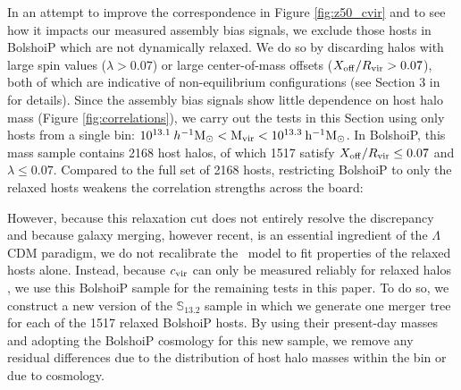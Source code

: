 \documentclass[twocolumn,apj,numberedappendix,twocolappendix,iop]{openjournal}
\begin{document}
In an attempt to improve the correspondence in Figure \ref{fig:z50_cvir} and to see how it impacts our measured assembly bias signals, we exclude those hosts in BolshoiP which are not dynamically relaxed. We do so by discarding halos with large spin values ($\lambda > 0.07$) or large center-of-mass offsets ($X_{\rm off}/R_{\rm vir} > 0.07$), both of which are indicative of non-equilibrium configurations (see Section 3 in \citealt{Klypin.etal.16} for details). Since the assembly bias signals show little dependence on host halo mass (Figure \ref{fig:correlations}), we carry out the tests in this Section using only hosts from a single bin: $10^{13.1} \>h^{-1}\rm M_\odot < M_{\rm vir} < 10^{13.3} \>h^{-1}\rm M_\odot$. In BolshoiP, this mass sample contains 2168 host halos, of which 1517 satisfy $X_{\rm off}/R_{\rm vir} \leq 0.07$ and $\lambda \leq 0.07$. Compared to the full set of 2168 hosts, restricting BolshoiP to only the relaxed hosts weakens the correlation strengths across the board:   

However, because this relaxation cut does not entirely resolve the discrepancy and because galaxy merging, however recent, is an essential ingredient of the $\Lambda$CDM paradigm, we do not recalibrate the \SatGen\ model to fit properties of the relaxed hosts alone. Instead, because $c_{\rm vir}$ can only be measured reliably for relaxed halos \citep{Klypin.etal.16}, we use this BolshoiP sample for the remaining tests in this paper. To do so, we construct a new version of the $\mathbb{S}_{13.2}$ sample in which we generate one merger tree for each of the 1517 relaxed BolshoiP hosts. By using their present-day masses and adopting the BolshoiP cosmology for this new sample, we remove any residual differences due to the distribution of host halo masses within the bin or due to cosmology. 

\subsection{\cite{Ludlow.etal.16}} 
\label{sec:ludlow}
\end{document}
